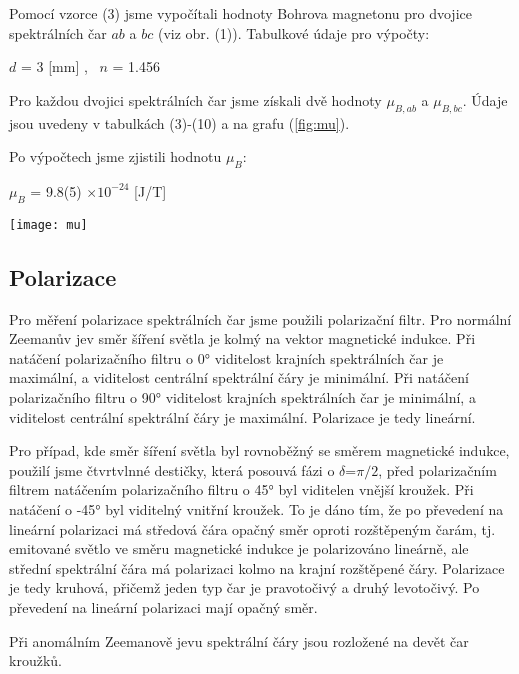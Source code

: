\documentclass[a4paper,11pt]{article}
\begin{document}
    \hspace{10pt}
    \begin{minipage}[t]{0.5\textwidth} 
                Pomocí vzorce (3) jsme vypočítali hodnoty Bohrova magnetonu pro dvojice spektrálních čar $ab$ a $bc$ (viz obr. (1)). Tabulkové údaje pro výpočty:
                \begin{center}
                    $d$ = 3 [mm] ,~ $n$ = 1.456 \\
                \end{center}
                
                Pro každou dvojici spektrálních čar jsme získali dvě hodnoty $\mu_{B,ab}$ a $\mu_{B,bc}$. Údaje jsou uvedeny v tabulkách (3)-(10) a na grafu (\ref{fig:mu}).
                \par Po výpočtech jsme zjistili hodnotu $\mu_B$:
                \begin{center}
                    $\mu_B$ = 9.8(5) $\times 10^{-24}$ [J/T]
                \end{center}

                \vspace{10pt}   
                \par \centering
                \texttt{[image: mu]}
                \captionsetup{justification=centering, font=footnotesize}
                \label{fig:mu}
                \vspace{10pt}
                \raggedright 

            \subsection{Polarizace}
                \par Pro měření polarizace spektrálních čar jsme použili polarizační filtr. Pro normální Zeemanův jev směr šíření světla je kolmý na vektor magnetické indukce. Při natáčení polarizačního filtru o 0° viditelost krajních spektrálních čar je maximální, a viditelost centrální spektrální čáry je minimální. Při natáčení polarizačního filtru o 90° viditelost krajních spektrálních čar je minimální, a viditelost centrální spektrální čáry je maximální. Polarizace je tedy lineární.
                \par Pro případ, kde směr šíření světla byl rovnoběžný se směrem magnetické indukce, použilí jsme čtvrtvlnné destičky, která posouvá fázi o $\delta$=$\pi/2$, před polarizačním filtrem natáčením polarizačního filtru o 45° byl viditelen vnější kroužek. Při natáčení o -45° byl viditelný vnitřní kroužek. To je dáno tím, že po převedení na lineární polarizaci má středová čára opačný směr oproti rozštěpeným čarám, tj. emitované světlo ve směru magnetické indukce je polarizováno lineárně, ale střední spektrální čára má polarizaci kolmo na krajní rozštěpené čáry. Polarizace je tedy kruhová, přičemž jeden typ čar je pravotočivý a druhý levotočivý. Po převedení na lineární polarizaci mají opačný směr.
                \par Při anomálním Zeemanově jevu spektrální čáry jsou rozložené na devět čar kroužků.
    \end{minipage}
\end{document}
